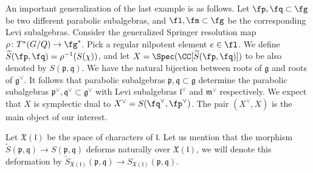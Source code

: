 \documentclass[12pt]{amsart}
\begin{document}
    An important generalization of the last example is as follows. Let $\fp, \fq \subset \fg$ be two different parabolic subalgebras, and $\fl, \fm \subset \fg$ be the corresponding Levi subalgebras. Consider the generalized Springer resolution map $\rho\colon T^*(G/Q)\to \fg^*$. Pick a regular nilpotent element $e\in \fl$. We define $\widetilde{S}(\fp, \fq)=\rho^{-1}(S(\chi))$, and let $X=\Spec(\CC[\widetilde{S}(\fp, \fq)])$ to be also denoted by $S(\mathfrak{p},\mathfrak{q})$.
    We have the natural bijection between roots of $\mathfrak{g}$ and roots of $\mathfrak{g}^\vee$. It follows that parabolic subalgebras $\mathfrak{p}, \mathfrak{q} \subset \mathfrak{g}$ determine the parabolic subalgebras $\mathfrak{p}^\vee, \mathfrak{q}^\vee \subset \mathfrak{g}^\vee$ with Levi subalgebras $\mathfrak{l}^\vee$ and $\mathfrak{m}^\vee$ respectively.
    We expect that $X$ is symplectic dual to $X^\vee=S(\fq^\vee, \fp^\vee)$. 
    The pair $(X^\vee, X)$ is the main object of our interest. 

    Let $\mathfrak{X}(\mathfrak{l})$ be the space of characters of $\mathfrak{l}$. Let us mention that the morphism $\widetilde{S}(\mathfrak{p},\mathfrak{q}) \rightarrow S(\mathfrak{p},\mathfrak{q})$ deforms naturally over $\mathfrak{X}(\mathfrak{l})$, we will denote this deformation by $\widetilde{S}_{\mathfrak{X}(\mathfrak{l})}(\mathfrak{p},\mathfrak{q}) \rightarrow S_{\mathfrak{X}(\mathfrak{l})}(\mathfrak{p},\mathfrak{q})$.
\end{document}
